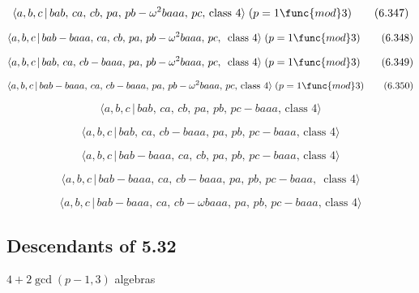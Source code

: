 \documentclass[10pt]{article}
\begin{document}
\begin{equation}
\langle a,b,c\,|\,bab,\,ca,\,cb,\,pa,\,pb-\omega ^2baaa,\,pc,\,\text{class }%
4\rangle\;(p=1 \func{mod} 3)  \tag{6.347}
\end{equation}

\begin{equation}
\langle a,b,c\,|\,bab-baaa,\,ca,\,cb,\,pa,\,pb-\omega ^2baaa,\,pc,\,\text{
class }4\rangle\;(p=1 \func{mod} 3)  \tag{6.348}
\end{equation}

\begin{equation}
\langle a,b,c\,|\,bab,\,ca,\,cb-baaa,\,pa,\,pb-\omega ^2baaa,\,pc,\,\text{
class }4\rangle\;(p=1 \func{mod} 3)  \tag{6.349}
\end{equation}

\begin{equation}
\langle a,b,c\,|\,bab-baaa,\,ca,\,cb-baaa,\,pa,\,pb-\omega ^2baaa,\,pc,\,%
\text{class }4\rangle\;(p=1 \func{mod} 3)  \tag{6.350}
\end{equation}

\begin{equation}
\langle a,b,c\,|\,bab,\,ca,\,cb,\,pa,\,pb,\,pc-baaa,\,\text{class }4\rangle 
\tag{6.351}
\end{equation}

\begin{equation}
\langle a,b,c\,|\,bab,\,ca,\,cb-baaa,\,pa,\,pb,\,pc-baaa,\,\text{class }%
4\rangle  \tag{6.352}
\end{equation}

\begin{equation}
\langle a,b,c\,|\,bab-baaa,\,ca,\,cb,\,pa,\,pb,\,pc-baaa,\,\text{class }%
4\rangle  \tag{6.353}
\end{equation}

\begin{equation}
\langle a,b,c\,|\,bab-baaa,\,ca,\,cb-baaa,\,pa,\,pb,\,pc-baaa,\,\text{ class 
}4\rangle  \tag{6.354}
\end{equation}

\begin{equation}
\langle a,b,c\,|\,bab-baaa,\,ca,\,cb-\omega baaa,\,pa,\,pb,\,pc-baaa,\,\text{
class }4\rangle  \tag{6.355}
\end{equation}

\subsection{Descendants of 5.32}

$4+2\gcd (p-1,3)$ algebras
\end{document}
